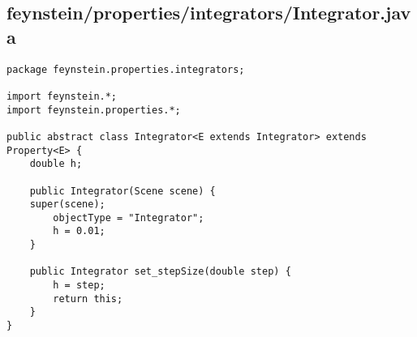 \subsection*{feynstein/properties/integrators/Integrator.java}
\begin{lstlisting}
package feynstein.properties.integrators;

import feynstein.*;
import feynstein.properties.*;

public abstract class Integrator<E extends Integrator> extends Property<E> {
    double h;
	
    public Integrator(Scene scene) {
	super(scene);
		objectType = "Integrator";
		h = 0.01;
    }

    public Integrator set_stepSize(double step) {
		h = step;
		return this;
    }
}\end{lstlisting}

